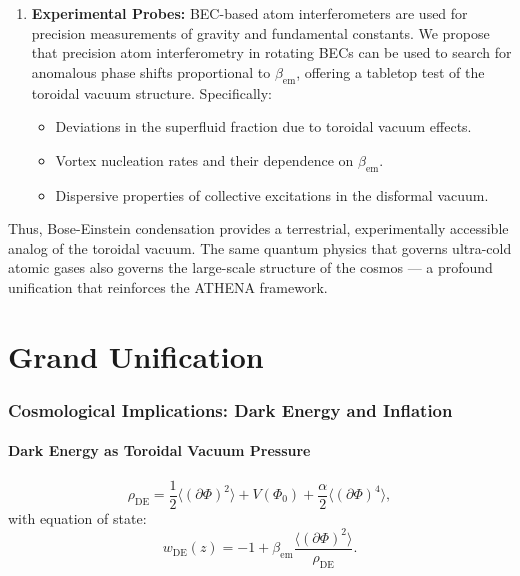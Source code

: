 \documentclass[12pt, a4paper]{article}
\begin{document}
\begin{enumerate}
    \item \textbf{Experimental Probes:} BEC-based atom interferometers are used for precision measurements of gravity and fundamental constants. We propose that precision atom interferometry in rotating BECs can be used to search for anomalous phase shifts proportional to $\beta_{\mathrm{em}}$, offering a tabletop test of the toroidal vacuum structure. Specifically:
    \begin{itemize}
        \item Deviations in the superfluid fraction due to toroidal vacuum effects.
        \item Vortex nucleation rates and their dependence on $\beta_{\mathrm{em}}$.
        \item Dispersive properties of collective excitations in the disformal vacuum.
    \end{itemize}
\end{enumerate}

Thus, Bose-Einstein condensation provides a terrestrial, experimentally accessible analog of the toroidal vacuum. The same quantum physics that governs ultra-cold atomic gases also governs the large-scale structure of the cosmos — a profound unification that reinforces the ATHENA framework.

\part{Grand Unification}
\section{Cosmological Implications: Dark Energy and Inflation}
\label{sec:cosmo}

\subsection{Dark Energy as Toroidal Vacuum Pressure}
\begin{equation}
\rho_{\mathrm{DE}} = \frac{1}{2} \langle (\partial \Phi)^2 \rangle + V(\Phi_0) + \frac{\alpha}{2} \langle (\partial \Phi)^4 \rangle,
\label{eq:de_density}
\end{equation}
with equation of state:
\begin{equation}
w_{\mathrm{DE}}(z) = -1 + \beta_{\mathrm{em}} \frac{\langle (\partial \Phi)^2 \rangle}{\rho_{\mathrm{DE}}}.
\label{eq:wDE}
\end{equation}
\end{document}
